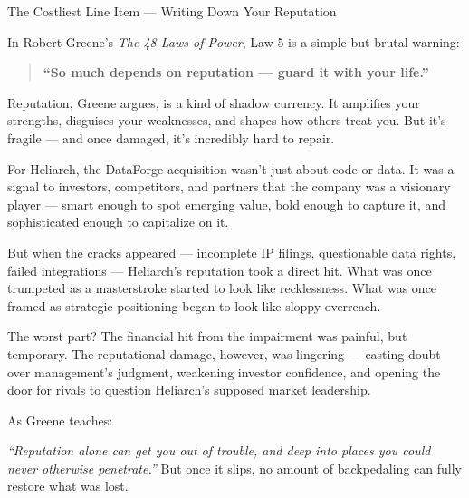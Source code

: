\begin{HistoricalSidebar}{The Costliest Line Item --- Writing Down Your Reputation}

In Robert Greene’s \textit{The 48 Laws of Power}, Law 5 is a simple but brutal warning:

\begin{quote}
    \textbf{“So much depends on reputation — guard it with your life.”}
\end{quote}

Reputation, Greene argues, is a kind of shadow currency.  
It amplifies your strengths, disguises your weaknesses, and shapes how others treat you.  
But it’s fragile — and once damaged, it’s incredibly hard to repair.

\medskip

For Heliarch, the DataForge acquisition wasn’t just about code or data.  
It was a signal to investors, competitors, and partners that the company was a visionary player —  
smart enough to spot emerging value, bold enough to capture it, and sophisticated enough to capitalize on it.

\medskip

But when the cracks appeared — incomplete IP filings, questionable data rights, failed integrations —  
Heliarch’s reputation took a direct hit.  
What was once trumpeted as a masterstroke started to look like recklessness.  
What was once framed as strategic positioning began to look like sloppy overreach.

\medskip

The worst part?  
The financial hit from the impairment was painful, but temporary.  
The reputational damage, however, was lingering —  
casting doubt over management’s judgment, weakening investor confidence, and opening the door for rivals to question Heliarch’s supposed market leadership.

\medskip

As Greene teaches:  

\medskip

\textit{“Reputation alone can get you out of trouble, and deep into places you could never otherwise penetrate.”}  
But once it slips, no amount of backpedaling can fully restore what was lost.
\end{HistoricalSidebar}